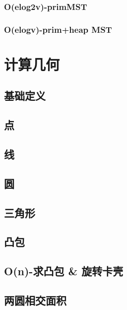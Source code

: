 \documentclass{ctexart}
\begin{document}
\subsubsection{O(elog2v)-primMST}

\subsubsection{O(elogv)-prim+heap MST}






\section{计算几何}
\subsection{基础定义}

\subsection{点}

\subsection{线}

\subsection{圆}

\subsection{三角形}

\subsection{凸包}



\subsection{O(n)-求凸包 \& 旋转卡壳}

\subsection{两圆相交面积}

\end{document}
